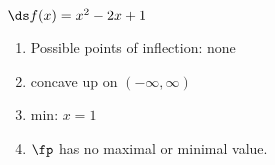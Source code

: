 {$\ds f(x) = x^2-2x+1$ \label{exer:03_04_ex_16}
}
{\begin{enumerate}[label=(\alph*)]
\item Possible points of inflection: none
\item concave up on $(-\infty,\infty)$
\item min: $x=1$
\item $\fp$ has no maximal or minimal value.
\end{enumerate}}
